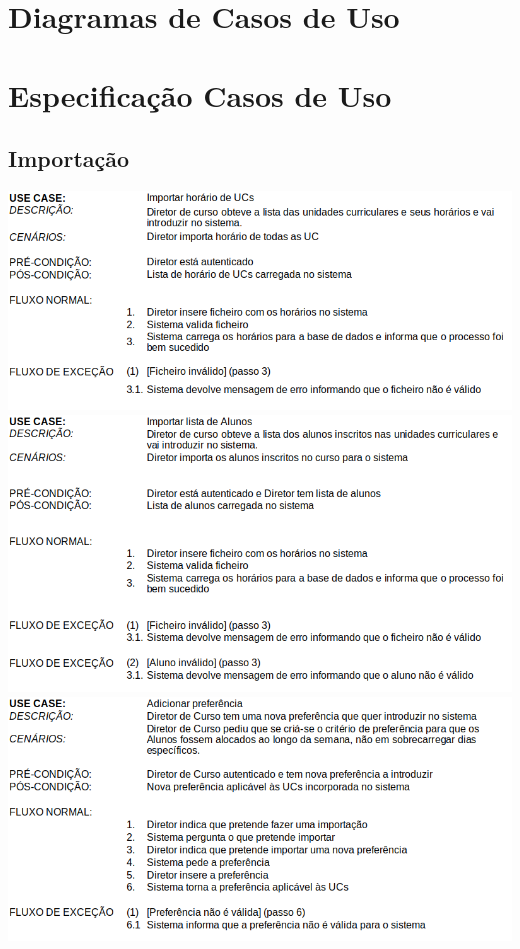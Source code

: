 \documentclass[a4paper,12pt]{article}
\begin{document}
    \section{Diagramas de Casos de Uso}

    \section{Especificação Casos de Uso}\vspace{0.5in}
    \subsection{Importação}
    \includegraphics[width=\textwidth]{importarHorariosUC.png}\vspace{0.5in}
    \includegraphics[width=\textwidth]{importarAlunos.png}\vspace{2cm}
    \includegraphics[width=\textwidth]{AddPrefer.png}
\end{document}
